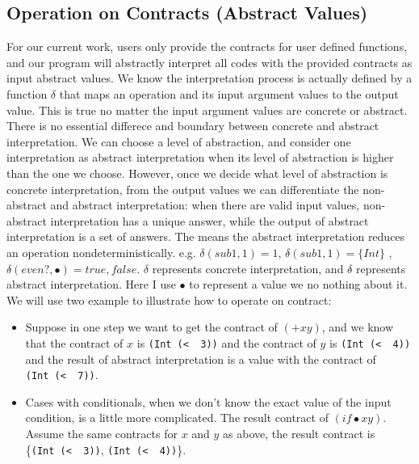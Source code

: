 \documentclass[paper=a4, fontsize=11pt]{scrartcl} %
\numberwithin{equation}{section} %
\numberwithin{figure}{section} %
\numberwithin{table}{section} %
\begin{document}
\subsection{Operation on Contracts (Abstract Values)}
For our current work, users only provide the contracts for user defined functions, and our program will abstractly interpret all codes with the provided contracts as input abstract values.
We know the interpretation process is actually defined by a function $\delta$ that maps an operation and its input argument values to the output value. This is true no matter the input argument values are concrete or abstract. There is no essential differece and boundary between concrete and abstract interpretation. We can choose a level of abstraction, and consider one interpretation as abstract interpretation when its level of abstraction is higher than the one we choose. However, once we decide what level of abstraction is concrete interpretation, from the output values we can differentiate the non-abstract and abstract interpretation: when there are valid input values, non-abstract interpretation has a unique answer, while the output of abstract interpretation is a set of answers. The means the abstract interpretation reduces an operation nondeterministically. e.g. $\delta(sub1, 1) = 1$, $\delta\hat{}(sub1, 1) = \{Int\}$ , $\delta\hat{}(even?, \bullet) = {true, false}$. $\delta$ represents concrete interpretation, and $\delta\hat{}$ represents abstract interpretation. Here I use $\bullet$ to represent a value we no nothing about it.
We will use two example to illustrate how to operate on contract:
\begin{itemize}
\item Suppose in one step we want to get the contract of $(+ x y)$, and we know that the contract of $x$ is \texttt{(Int\ (\textless\ \underscore\ 3))} and the contract of $y$ is \texttt{(Int\ (\textless\ \underscore\ 4))} and the result of abstract interpretation is a value with the contract of \texttt{(Int\ (\textless\ \underscore\ 7))}.

\item Cases with conditionals, when we don't know the exact value of the input condition, is a little more complicated. The result contract of $(if \bullet x y)$. Assume the same contracts for $x$ and $y$ as above, the result contract is \{\texttt{(Int\ (\textless\ \underscore\ 3))}, \texttt{(Int\ (\textless\ \underscore\ 4))}\}.

\end{itemize}
 
\end{document}

